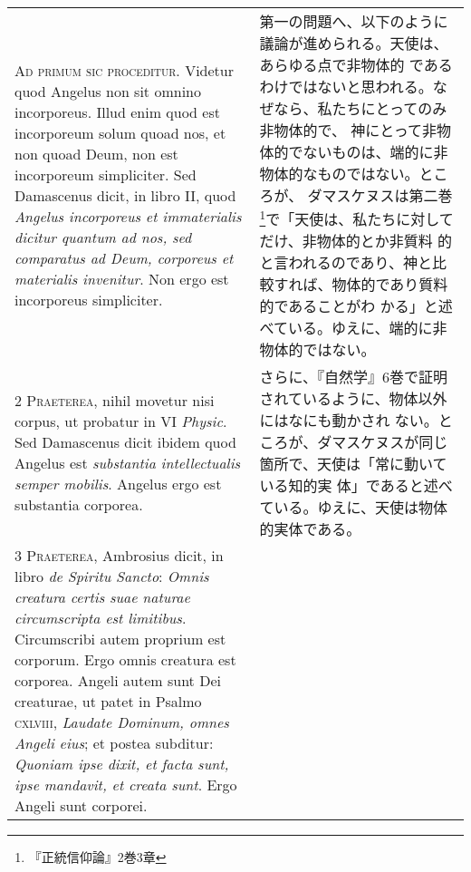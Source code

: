 \documentclass[10pt]{jsarticle} %
\begin{document}
\begin{longtable}{p{21em}p{21em}}


{\huge A}{\scshape d primum sic proceditur}. Videtur quod Angelus non
sit omnino incorporeus. Illud enim quod est incorporeum solum quoad nos,
et non quoad Deum, non est incorporeum simpliciter. Sed Damascenus
dicit, in libro II, quod {\itshape Angelus incorporeus et immaterialis
dicitur quantum ad nos, sed comparatus ad Deum, corporeus et materialis
invenitur}. Non ergo est incorporeus simpliciter.

&

第一の問題へ、以下のように議論が進められる。天使は、あらゆる点で非物体的
 であるわけではないと思われる。なぜなら、私たちにとってのみ非物体的で、
 神にとって非物体的でないものは、端的に非物体的なものではない。ところが、
 ダマスケヌスは第二巻\footnote{『正統信仰論』2巻3章}で「天使は、私たちに対してだけ、非物体的とか非質料
 的と言われるのであり、神と比較すれば、物体的であり質料的であることがわ
 かる」と述べている。ゆえに、端的に非物体的ではない。

\\


{\scshape 2 Praeterea}, nihil movetur nisi corpus, ut probatur in VI
{\itshape Physic}. Sed Damascenus dicit ibidem quod Angelus est
{\itshape substantia intellectualis semper mobilis}. Angelus ergo est
substantia corporea.


&

さらに、『自然学』6巻で証明されているように、物体以外にはなにも動かされ
 ない。ところが、ダマスケヌスが同じ箇所で、天使は「常に動いている知的実
 体」であると述べている。ゆえに、天使は物体的実体である。

\\


{\scshape 3 Praeterea}, Ambrosius dicit, in libro {\itshape de Spiritu Sancto}:
{\itshape Omnis creatura certis suae naturae circumscripta est
limitibus}. Circumscribi autem proprium est corporum. Ergo omnis
creatura est corporea. Angeli autem sunt Dei creaturae, ut patet in
Psalmo {\scshape cxlviii}, {\itshape Laudate Dominum, omnes Angeli
eius}; et postea subditur: {\itshape Quoniam ipse dixit, et facta sunt,
ipse mandavit, et creata sunt}. Ergo Angeli sunt corporei.


&


\end{longtable}
\end{document}

